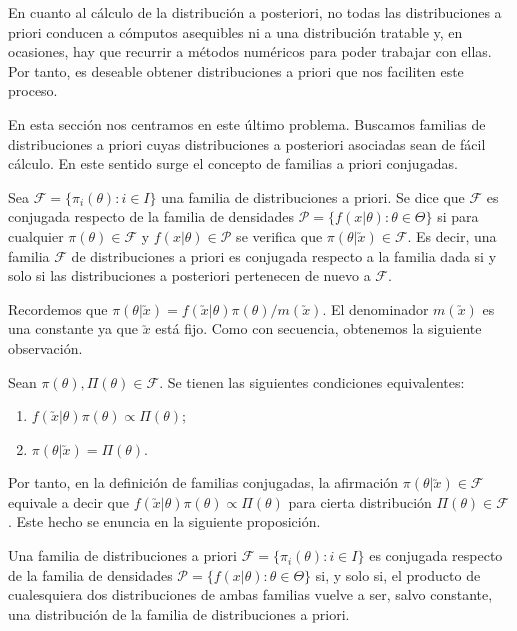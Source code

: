 En cuanto al cálculo de la distribución a posteriori, no todas las distribuciones a priori conducen a cómputos asequibles ni a una distribución tratable y, en ocasiones, hay que recurrir a métodos numéricos para poder trabajar con ellas. Por tanto, es deseable obtener distribuciones a priori que nos faciliten este proceso.

En esta sección nos centramos en este último problema. Buscamos familias de distribuciones a priori cuyas distribuciones a posteriori asociadas sean de fácil cálculo. En este sentido surge el concepto de familias a priori conjugadas.

\begin{definition}
	Sea $\mathcal{F} = \{\pi_i(\theta): i\in I\}$ una familia de distribuciones a priori. Se dice que $\mathcal{F}$ es conjugada respecto de la familia de densidades $\mathcal{P} = \{f(x|\theta): \theta\in\Theta\}$ si para cualquier $\pi(\theta)\in\mathcal{F}$ y $f(x|\theta)\in \mathcal{P}$ se verifica que $\pi(\theta|\utilde{x}) \in \mathcal{F}$. Es decir, una familia $\mathcal{F}$ de distribuciones a priori es conjugada respecto a la familia dada si y solo si las distribuciones a posteriori pertenecen de nuevo a $\mathcal{F}$.
\end{definition}

Recordemos que $\pi(\theta|\utilde{x}) = f(\utilde{x}|\theta)\pi(\theta) / m(\utilde{x})$. El denominador $m(\utilde{x})$ es una constante ya que $\utilde{x}$ está fijo. Como con secuencia, obtenemos la siguiente observación.

\begin{remark}
	Sean $\pi(\theta), \Pi(\theta) \in \mathcal{F}$. Se tienen las siguientes condiciones equivalentes:
	\begin{enumerate}%
		\item $f(\utilde{x}|\theta)\pi(\theta) \propto \Pi(\theta)$;
		\item $\pi(\theta|\utilde{x})=\Pi(\theta)$.
	\end{enumerate}
\end{remark}

 Por tanto, en la definición de familias conjugadas, la afirmación $\pi(\theta|\utilde{x}) \in \mathcal{F}$ equivale a decir que $f(\utilde{x}|\theta)\pi(\theta) \propto \Pi(\theta)$ para cierta distribución $\Pi(\theta) \in \mathcal{F}$. Este hecho se enuncia en la siguiente proposición.

\begin{prop}
    Una familia de distribuciones a priori $\mathcal{F} = \{\pi_i(\theta): i\in I\}$ es conjugada respecto de la familia de densidades $\mathcal{P} = \{f(x|\theta): \theta\in\Theta\}$ si, y solo si, el producto de cualesquiera dos distribuciones de ambas familias vuelve a ser, salvo constante, una distribución de la familia de distribuciones a priori.
\end{prop}

